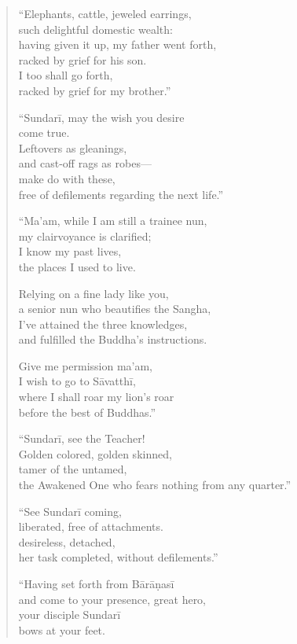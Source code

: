 \documentclass[12pt,openany]{book}%
\begin{document}
\begin{verse}
“Elephants, cattle, jeweled earrings, \\
such delightful domestic wealth: \\
having given it up, my father went forth, \\
racked by grief for his son. \\
I too shall go forth, \\
racked by grief for my brother.” 

“\textsanskrit{Sundarī}, may the wish you desire \\
come true. \\
Leftovers as gleanings, \\
and cast-off rags as robes—\\
make do with these, \\
free of defilements regarding the next life.” 

“Ma’am, while I am still a trainee nun, \\
my clairvoyance is clarified; \\
I know my past lives, \\
the places I used to live. 

Relying on a fine lady like you, \\
a senior nun who beautifies the Sangha, \\
I’ve attained the three knowledges, \\
and fulfilled the Buddha’s instructions. 

Give me permission ma’am, \\
I wish to go to \textsanskrit{Sāvatthī}, \\
where I shall roar my lion’s roar \\
before the best of Buddhas.” 

“\textsanskrit{Sundarī}, see the Teacher! \\
Golden colored, golden skinned, \\
tamer of the untamed, \\
the Awakened One who fears nothing from any quarter.” 

“See \textsanskrit{Sundarī} coming, \\
liberated, free of attachments. \\
desireless, detached, \\
her task completed, without defilements.” 

“Having set forth from \textsanskrit{Bārāṇasī} \\
and come to your presence, great hero, \\
your disciple \textsanskrit{Sundarī} \\
bows at your feet. 


\end{verse}
\end{document}
